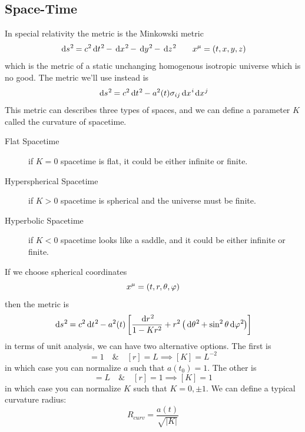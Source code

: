 \subsection{Space-Time}
In special relativity the metric is the Minkowski metric
\begin{equation}
  \dl s^2 = c^2 \dl t^2 - \dl x^2 -\dl y^2 - \dl z^2 \qquad x^\mu = \ins{t,x,y,z}
\end{equation}
which is the metric of a static unchanging homogenous isotropic universe which is no good. The metric we'll use instead is
\begin{equation}
  \dl s^2 = c^2 \dl t^2 - a^2(t)\sigma_{ij}\dl x^i \dl x^j
\end{equation}
This metric can describes three types of spaces, and we can define a parameter \(K\) called the curvature of spacetime.
\begin{description}
  \item[Flat Spacetime] if \(K=0\) spacetime is flat, it could be either infinite or finite.
  \item[Hyperspherical Spacetime] if \(K>0\) spacetime is spherical and the universe must be finite.
  \item[Hyperbolic Spacetime] if \(K<0\) spacetime looks like a saddle, and it could be either infinite or finite.
\end{description}
If we choose spherical coordinates
\begin{equation}
  x^\mu = \left(t,r,\theta,\varphi\right)
\end{equation}
then the metric is
\begin{equation}
  \dl s^2 = c^2 \dl t^2 - a^2(t)\left[\frac{\dl r^2}{1-Kr^2}+r^2\ins{\dl \theta^2+\sin^2\theta\dl \phi^2}\right]
\end{equation}
in terms of unit analysis, we can have two alternative options. The first is
\begin{equation}
  [a] = 1 \quad \& \quad [r]=L  \implies [K]=L^{-2}
\end{equation}
in which case you can normalize \(a\) such that \(a(t_0)=1\). The other is
\begin{equation}
  [a]=L \quad \& \quad [r]=1 \implies [K]=1
\end{equation}
in which case you can normalize \(K\) such that \(K=0,\pm 1\). We can define a typical curvature radius:
\begin{equation}
  R_{curv} = \frac{a(t)}{\sqrt{\lvert K \rvert}}
\end{equation}
